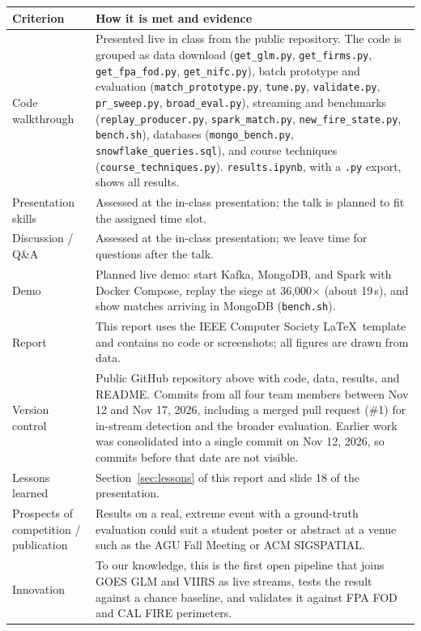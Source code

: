 \documentclass[10pt,journal,compsoc]{IEEEtran}
\begin{document}
\medskip
\renewcommand{\arraystretch}{1.25}
\small
\begin{tabularx}{\textwidth}{@{}>{\raggedright\arraybackslash}p{3.6cm}>{\raggedright\arraybackslash}X@{}}
\toprule
Criterion & How it is met and evidence \\
\midrule
Code walkthrough & Presented live in class from the public repository. The code is grouped as data download (\texttt{get\_glm.py}, \texttt{get\_firms.py}, \texttt{get\_fpa\_fod.py}, \texttt{get\_nifc.py}), batch prototype and evaluation (\texttt{match\_prototype.py}, \texttt{tune.py}, \texttt{validate.py}, \texttt{pr\_sweep.py}, \texttt{broad\_eval.py}), streaming and benchmarks (\texttt{replay\_producer.py}, \texttt{spark\_match.py}, \texttt{new\_fire\_state.py}, \texttt{bench.sh}), databases (\texttt{mongo\_bench.py}, \texttt{snowflake\_queries.sql}), and course techniques (\texttt{course\_techniques.py}). \texttt{results.ipynb}, with a \texttt{.py} export, shows all results. \\
Presentation skills & Assessed at the in-class presentation; the talk is planned to fit the assigned time slot. \\
Discussion / Q\&A & Assessed at the in-class presentation; we leave time for questions after the talk. \\
Demo & Planned live demo: start Kafka, MongoDB, and Spark with Docker Compose, replay the siege at 36,000$\times$ (about 19\,s), and show matches arriving in MongoDB (\texttt{bench.sh}). \\
Report & This report uses the IEEE Computer Society \LaTeX\ template and contains no code or screenshots; all figures are drawn from data. \\
Version control & Public GitHub repository above with code, data, results, and README. Commits from all four team members between Nov 12 and Nov 17, 2026, including a merged pull request (\#1) for in-stream detection and the broader evaluation. Earlier work was consolidated into a single commit on Nov 12, 2026, so commits before that date are not visible. \\
Lessons learned & Section~\ref{sec:lessons} of this report and slide 18 of the presentation. \\
Prospects of competition / publication & Results on a real, extreme event with a ground-truth evaluation could suit a student poster or abstract at a venue such as the AGU Fall Meeting or ACM SIGSPATIAL. \\
Innovation & To our knowledge, this is the first open pipeline that joins GOES GLM and VIIRS as live streams, tests the result against a chance baseline, and validates it against FPA FOD and CAL FIRE perimeters. \\

\end{tabularx}
\end{document}
